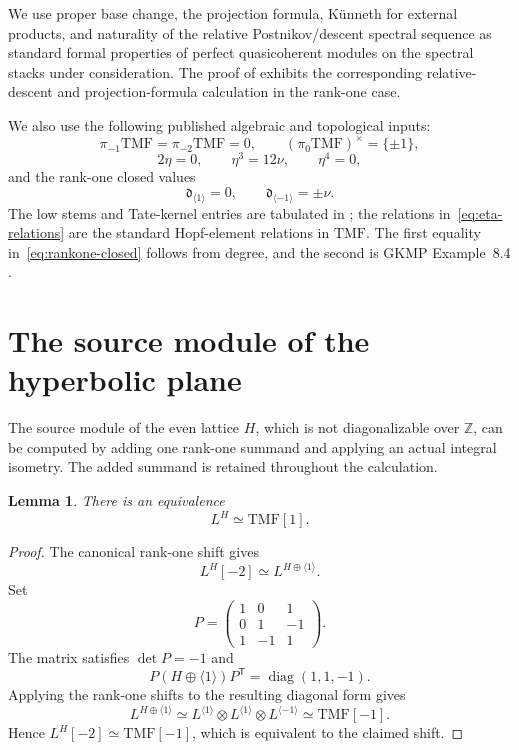 \documentclass[11pt,a4paper]{amsart}
\newcommand{\Z}{\mathbb Z}
\newcommand{\TMF}{\mathrm{TMF}}
\newcommand{\dclass}{\mathfrak d}
\theoremstyle{plain}
\newtheorem{lemma}[theorem]{Lemma}
\theoremstyle{definition}
\theoremstyle{remark}
\begin{document}
We use proper base change, the projection formula, K\"unneth for
external products, and naturality of the relative
Postnikov/descent spectral sequence as standard formal properties
of perfect quasicoherent modules on the spectral stacks under
consideration. The proof of \cite[Theorem~10.1]{GM23} exhibits the
corresponding relative-descent and projection-formula calculation
in the rank-one case.

We also use the following published algebraic and topological inputs:
\begin{equation}\label{eq:low-stems}
 \pi_{-1}\TMF=\pi_{-2}\TMF=0,
 \qquad
 (\pi_0\TMF)^\times=\{\pm1\},
\end{equation}
\begin{equation}\label{eq:eta-relations}
 2\eta=0,
 \qquad
 \eta^3=12\nu,
 \qquad
 \eta^4=0,
\end{equation}
and the rank-one closed values
\begin{equation}\label{eq:rankone-closed}
 \dclass_{\langle1\rangle}=0,
 \qquad
 \dclass_{\langle-1\rangle}=\pm\nu.
\end{equation}
The low stems and Tate-kernel entries are tabulated in
\cite[Appendix~C]{TY}; the relations in~\eqref{eq:eta-relations}
are the standard Hopf-element relations in $\TMF$.
The first equality in~\eqref{eq:rankone-closed} follows from
degree, and the second is GKMP Example~8.4 \cite{GKMP}.

\section{The source module of the hyperbolic plane}\label{sec:H-shift}

The source module of the even lattice $H$, which is not
diagonalizable over $\Z$, can be computed by adding one rank-one
summand and applying an actual integral isometry. The added
summand is retained throughout the calculation.

\begin{lemma}\label{lem:H-shift}
There is an equivalence
\[
 L^H\simeq\TMF[1].
\]
\end{lemma}

\begin{proof}
The canonical rank-one shift gives
\[
 L^H[-2]\simeq L^{H\oplus\langle1\rangle}.
\]
Set
\[
 P=\begin{pmatrix}
 1&0&1\\
 0&1&-1\\
 1&-1&1
 \end{pmatrix}.
\]
The matrix satisfies $\det P=-1$ and
\[
 P(H\oplus\langle1\rangle)P^{\mathsf T}
 =\operatorname{diag}(1,1,-1).
\]
Applying the rank-one shifts to the resulting diagonal form gives
\[
 L^{H\oplus\langle1\rangle}
 \simeq
 L^{\langle1\rangle}\otimes L^{\langle1\rangle}\otimes L^{\langle-1\rangle}
 \simeq\TMF[-1].
\]
Hence $L^H[-2]\simeq\TMF[-1]$, which is equivalent to the
claimed shift.
\end{proof}
\end{document}
